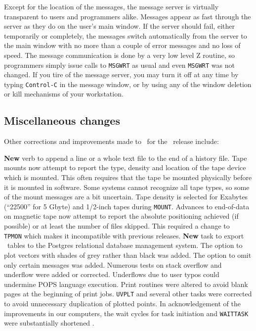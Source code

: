 Except for the location of the messages, the message server is
virtually transparent to users and programmers alike.  Messages appear
as fast through the server as they do on the user's main window.  If
the server should fail, either temporarily or completely, the messages
switch automatically from the server to the main window with no more
than a couple of error messages and no loss of speed.  The message
communication is done by a very low level Z routine, so programmers
simply issue calls to {\tt MSGWRT} as usual and even {\tt MSGWRT} was
not changed.  If you tire of the message server, you may turn it off
at any time by typing {\tt Control-C} in the message window, or by
using any of the window deletion or kill mechanisms of your
workstation.

\subsection{Miscellaneous changes}

Other corrections and improvements made to \AIPS\ for the
\RELEASENAME\ release include:
\begin{description}
 {\bf New} verb to append a line or a whole text file
    to the end of a history file.
 Tape mounts now attempt to report the type, density and
    location of the tape device which is mounted.  This often requires
    that the tape be mounted physically before it is mounted in
    software.  Some systems cannot recognize all tape types, so some
    of the mount messages are a bit uncertain.  Tape density is
    selected for Exabytes (``22500'' for 5 Gbyte) and 1/2-inch tapes
    during \hbox{{\tt MOUNT}}.
 Advances to end-of-data on magnetic tape now attempt to
    report the absolute positioning achieved (if possible) or at least
    the number of files skipped.  This required a change to {\tt
    TPMON} which makes it incompatible with previous releases.
 {\bf New} task to export \AIPS\ tables to the Postgres
    relational database management system.
 The option to plot vectors with shades of grey rather
    than black was added.
 The option to omit only certain messages was added.
 Numerous tests on stack overflow and underflow were
    added or corrected.  Underflows due to user typos could undermine
    POPS language execution.
 Print routines were altered to avoid blank
    pages at the beginning of print jobs.
 {\tt UVPLT} and several other tasks were
    corrected to avoid unnecessary duplication of plotted points.
 In acknowledgement of the improvements in our
    computers, the wait cycles for task initiation and {\tt WAITTASK}
    were substantially shortened .
\end{description}

